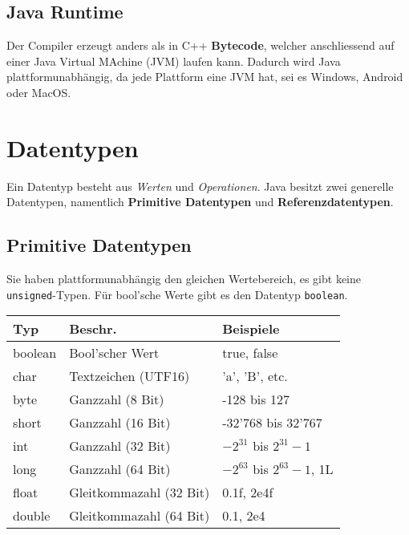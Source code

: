 \subsection{Java Runtime}
Der Compiler erzeugt anders als in C++ \textbf{Bytecode}, welcher anschliessend auf einer Java Virtual MAchine (JVM) laufen kann.
Dadurch wird Java plattformunabhängig, da jede Plattform eine JVM hat, sei es Windows, Android oder MacOS.


\section{Datentypen}

Ein Datentyp besteht aus \textit{Werten} und \textit{Operationen}. Java besitzt zwei generelle Datentypen, 
namentlich \textbf{Primitive Datentypen} und \textbf{Referenzdatentypen}.

\subsection{Primitive Datentypen}
Sie haben plattformunabhängig den gleichen Wertebereich, es gibt keine \verb|unsigned|-Typen. Für bool'sche Werte gibt es den Datentyp \verb|boolean|.

\begin{center}
    \begin{tabular}{lll}
        \rowcolor[RGB]{239,239,239} 
        \textbf{Typ} & \textbf{Beschr.}        & \textbf{Beispiele} \\ \hline
        boolean      & Bool'scher Wert         & true, false \\
        char         & Textzeichen (UTF16)     & 'a', 'B', etc. \\
        byte         & Ganzzahl (8 Bit)        & -128 bis 127 \\
        short        & Ganzzahl (16 Bit)       & -32'768 bis 32'767 \\
        int          & Ganzzahl (32 Bit)       & $ -2^{31} $ bis $ 2^{31}-1 $ \\
        long         & Ganzzahl (64 Bit)       & $ -2^{63} $ bis $ 2^{63}-1 $, 1L \\
        float        & Gleitkommazahl (32 Bit) & 0.1f, 2e4f \\
        double       & Gleitkommazahl (64 Bit) & 0.1, 2e4 \\
    \end{tabular}
\end{center}


